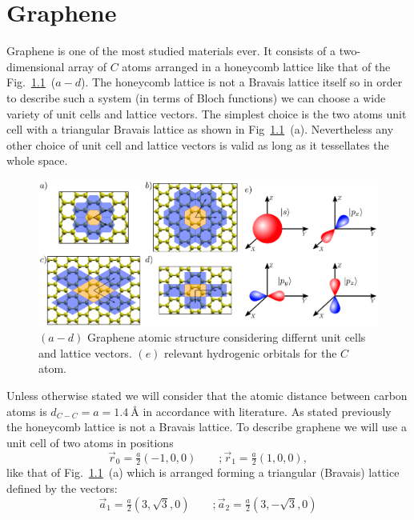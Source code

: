 \chapter{Graphene}
\label{ch:graphene}
Graphene is one of the most studied materials ever. It consists of a two-dimensional array of $C$ atoms arranged in a honeycomb lattice like that of the Fig.~\ref{graphene_structure}~($a-d$). The honeycomb lattice is not a Bravais lattice itself so in order to describe such a system (in terms of Bloch functions) we can choose a wide variety of unit cells and lattice vectors. The simplest choice is the two atoms unit cell with a triangular Bravais lattice as shown in Fig~\ref{graphene_structure}~(a). Nevertheless any other choice of unit cell and lattice vectors is valid as long as it tessellates the whole space.
\begin{figure}[h!]
\centering
\includegraphics[width=\textwidth]{chapter04/figures/graphene.pdf}
\vspace{-5pt}
\caption{$(a-d)$ Graphene atomic structure considering differnt unit cells and lattice vectors. $(e)$ relevant hydrogenic orbitals for the $C$ atom.}
\label{graphene_structure}
\end{figure}
\FloatBarrier
Unless otherwise stated we will consider that the atomic distance between carbon atoms is $d_{C-C}=a=\SI{1.4}{\angstrom}$ in accordance with literature\cite{KatsnelsonBook}. %
As stated previously the honeycomb lattice is not a Bravais lattice. To describe graphene we will use a unit cell of two atoms in positions
\begin{equation}
\vec{r}_0 = \tfrac{a}{2}(-1,0,0) \qquad;
\vec{r}_1 = \tfrac{a}{2}(1,0,0),
\label{at_pos}
\end{equation}
like that of Fig.~\ref{graphene_structure}~(a) which is arranged forming a triangular (Bravais) lattice defined by the vectors:
\begin{equation}
\vec{a}_1 = \tfrac{a}{2}\left(3,\sqrt{3},0\right) \qquad;
\vec{a}_2 = \tfrac{a}{2}\left(3,-\sqrt{3},0\right)
\label{latt_vec}
\end{equation}

